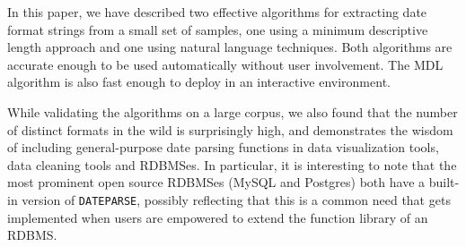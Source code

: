 In this paper, we have described two effective algorithms for extracting date format strings from a small set of samples, one using a minimum descriptive length approach and one using natural language techniques. Both algorithms are accurate enough to be used automatically without user involvement. The MDL algorithm is also fast enough to deploy in an interactive environment.

While validating the algorithms on a large corpus, we also found that the number of distinct formats in the wild is surprisingly high, and demonstrates the wisdom of including general-purpose date parsing functions in data visualization tools, data cleaning tools and RDBMSes. In particular, it is interesting to note that the most prominent open source RDBMSes (\eg MySQL and Postgres) both have a built-in version of \texttt{DATEPARSE}, possibly reflecting that this is a common need that gets implemented when users are empowered to extend the function library of an RDBMS.
